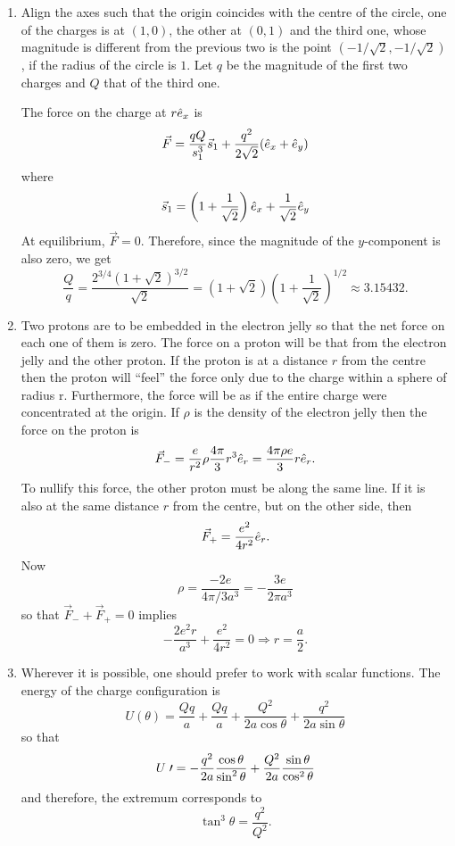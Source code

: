 \documentclass{article}
\begin{document}
\begin{enumerate}
\item Align the axes such that the origin coincides with the centre of the circle,
one of the charges is at $(1, 0)$, the other at $(0, 1)$ and the third one, whose
magnitude is different from the previous two is the point $(-1/\sqrt{2}, 
-1/\sqrt{2})$, if the radius of the circle is $1$. Let $q$ be the magnitude of
the first two charges and $Q$ that of the third one. 

The force on the charge at $r\hat{e}_{x}$ is
\[
\vec{F} = \frac{qQ}{s_1^3}\vec{s}_1 + \frac{q^2}{2\sqrt{2}}(\hat{e}_{x} + \hat{e}_{y})
\]
where
\[
\vec{s}_1 = \left(1 + \frac{1}{\sqrt{2}}\right)\hat{e}_{x} + \frac{1}{\sqrt{2}}\hat{e}_{y}
\]
At equilibrium, $\vec{F} = 0$. Therefore, since the magnitude of the $y$-component
is also zero, we get
\[
\frac{Q}{q} = \frac{2^{3/4}(1 + \sqrt{2})^{3/2}}{\sqrt{2}} = 
(1 + \sqrt{2})\left(1 + \frac{1}{\sqrt{2}}\right)^{1/2} \approx 3.15432.
\]

\item Two protons are to be embedded in the electron jelly so that the net force
on each one of them is zero. The force on a proton will be that from the electron
jelly and the other proton. If the proton is at a distance $r$ from the centre 
then the proton will ``feel'' the force only due to the charge within a sphere of
radius r. Furthermore, the force will be as if the entire charge were concentrated
at the origin. If $\rho$ is the density of the electron jelly then the force on 
the proton is
\[
\vec{F}_- = \frac{e}{r^2}\rho\frac{4\pi}{3}r^3\hat{e}_{r} = \frac{4\pi\rho e}{3}r\hat{e}_{r}.
\]
To nullify this force, the other proton must be along the same line. If it is also
at the same distance $r$ from the centre, but on the other side, then
\[
\vec{F}_+ = \frac{e^2}{4r^2}\hat{e}_{r}.
\]
Now 
\[
\rho = \frac{-2e}{4\pi/3 a^3} = -\frac{3e}{2\pi a^3}
\]
so that $\vec{F}_- + \vec{F}_+ = 0$ implies
\[
-\frac{2e^2r}{a^3} + \frac{e^2}{4r^2} = 0 \Rightarrow r = \frac{a}{2}.
\]

\item Wherever it is possible, one should prefer to work with scalar functions.
The energy of the charge configuration is
\[
U(\theta) = \frac{Qq}{a} + \frac{Qq}{a} + \frac{Q^2}{2a\cos\theta} + \frac{q^2}{2a\sin\theta}
\]
so that
\[
U{\;\prime} = -\frac{q^2}{2a}\frac{\cos\theta}{\sin^2\theta} + 
\frac{Q^2}{2a}\frac{\sin\theta}{\cos^2\theta}
\]
and therefore, the extremum corresponds to
\[
\tan^3\theta = \frac{q^2}{Q^2}.
\]


\end{enumerate}
\end{document}
